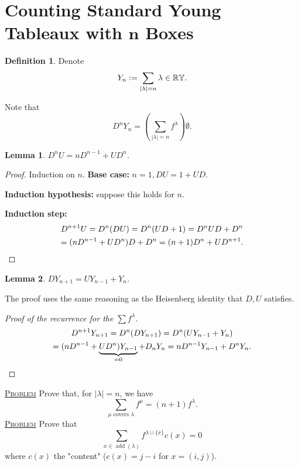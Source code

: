 \documentclass{report}
\newcommand{\R}{\mathbb{R}}
\def \add {\operatorname{add}}
\newcommand{\defeq}{\vcentcolon=}
\newcommand{\fancyem}[1]{\underline{\textsc{#1}}}
\newtheorem{lemma}{Lemma}[section]
\theoremstyle{definition}
\newtheorem{definition}{Definition}[section]
\theoremstyle{remark}
\numberwithin{equation}{section}
\newcommand{\fnl}{\parbox[t]{0\linewidth}{}}
\newcommand*\ttlmath[2]{\texorpdfstring{$\boldsymbol{#1}$}{#2}}
\begin{document}
\section{Counting Standard Young Tableaux with \ttlmath{n}{n} Boxes}
\begin{definition}
    Denote \[
        Y_n \defeq \sum_{|\lambda| = n} \lambda \in \R\mathbb{Y}.    
    \]
\end{definition}
Note that \[
    D^nY_n = \left(\sum_{|\lambda| = n} f^\lambda\right)\emptyset.
\]
\begin{lemma}
    $D^nU = nD^{n-1} + UD^n$.
\end{lemma}
\begin{proof}
    Induction on $n$.
    \textbf{Base case:} $n = 1, DU = 1 + UD$.
    
    \textbf{Induction hypothesis:} suppose this holds for $n$.

    \textbf{Induction step:} \begin{multline*}
        D^{n+1}U = D^n(DU) = D^n(UD + 1) = D^nUD + D^n \\
        = (nD^{n-1} + UD^n)D + D^n = (n+1)D^n + UD^{n+1}. \qedhere
    \end{multline*}
\end{proof}
\begin{lemma}
    $DY_{n+1} = UY_{n-1} + Y_n$.
\end{lemma}
The proof uses the same reasoning as the Heisenberg identity that $D, U$ satisfies.

\begin{proof}
    [Proof of the recurrence for the $\sum f^\lambda$]\fnl
    \begin{multline*}
        D^{n+1}Y_{n+1} = D^n(DY_{n+1}) = D^n(UY_{n-1} + Y_n) \\
        = (nD^{n-1} + \underbrace{UD^n)Y_{n-1}}_{=0} + D_nY_n = nD^{n-1}Y_{n-1} + D^nY_n. \qedhere
    \end{multline*}
\end{proof}

\fancyem{Problem} Prove that, for $|\lambda| = n$, we have \[
    \sum_{\mu \text{ covers } \lambda} f^\mu = (n+1)f^\lambda.    
\]
\fancyem{Problem} Prove that \[
    \sum_{x \in \add(\lambda)} f^{\lambda \cup \{x\}}c(x) = 0
\]
where $c(x)$ the "content" ($c(x) = j - i$ for $x = (i, j)$).
\end{document}

